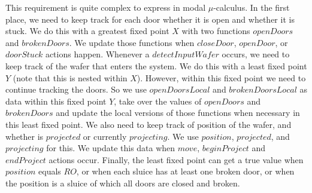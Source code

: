 \begin{description}
This requirement is quite complex to express in modal $\mu$-calculus. In the first place, we need to keep track for each door whether it is open and whether it is stuck. We do this with a greatest fixed point $X$ with two functions $openDoors$ and $brokenDoors$. We update those functions when $closeDoor$, $openDoor$, or $doorStuck$ actions happen. Whenever a $detectInputWafer$ occurs, we need to keep track of the wafer that enters the system. We do this with a least fixed point $Y$ (note that this is nested within $X$). However, within this fixed point we need to continue tracking the doors. So we use $openDoorsLocal$ and $brokenDoorsLocal$ as data within this fixed point $Y$, take over the values of $openDoors$ and $brokenDoors$ and update the local versions of those functions when necessary in this least fixed point. We also need to keep track of position of the wafer, and whether is $projected$ or currently $projecting$. We use $position$, $projected$, and $projecting$ for this. We update this data when $move$, $beginProject$ and $endProject$ actions occur. Finally, the least fixed point can get a true value when $position$ equals $RO$, or when each sluice has at least one broken door, or when the position is a sluice of which all doors are closed and broken.
 

\end{description}
